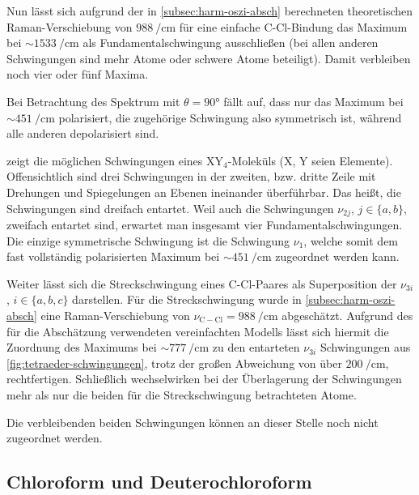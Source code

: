 \documentclass[../bericht.tex]{subfiles}
\begin{document}
        Nun lässt sich aufgrund der in \cref{subsec:harm-oszi-absch} berechneten theoretischen Raman-Verschiebung von $\SI{988}{\per\centi\meter}$ für eine einfache C-Cl-Bindung das Maximum bei $\sim \SI{1533}{\per\centi\meter}$ als Fundamentalschwingung ausschließen (bei allen anderen Schwingungen sind mehr Atome oder schwere Atome beteiligt). Damit verbleiben noch vier oder fünf Maxima.

        Bei Betrachtung des Spektrum mit $\theta=\ang{90}$ fällt auf, dass nur das Maximum bei $\sim\SI{451}{\per\centi\meter}$ polarisiert, die zugehörige Schwingung also symmetrisch ist, während alle anderen depolarisiert sind.

         zeigt die möglichen Schwingungen eines $\mathrm{XY_4}$-Moleküls (X, Y seien Elemente). Offensichtlich sind drei Schwingungen in der zweiten, bzw. dritte Zeile mit Drehungen und Spiegelungen an Ebenen ineinander überführbar. Das heißt, die Schwingungen sind dreifach entartet. Weil auch die Schwingungen $\nu_{2j}$, $j\in\{a,b\}$, zweifach entartet sind, erwartet man insgesamt vier Fundamentalschwingungen. Die einzige symmetrische Schwingung ist die Schwingung $\nu_1$, welche somit dem fast vollständig polarisierten Maximum bei $\sim\SI{451}{\per\centi\meter}$ zugeordnet werden kann.
        \medskip

        Weiter lässt sich die Streckschwingung eines C-Cl-Paares als Superposition der $\nu_{3i}$, $i\in\{ a,b,c\}$ darstellen. Für die Streckschwingung wurde in \cref{subsec:harm-oszi-absch} eine Raman-Verschiebung von $\nu_\mathrm{C-Cl}=\SI{988}{\per\centi\meter}$ abgeschätzt. Aufgrund des für die Abschätzung verwendeten vereinfachten Modells lässt sich hiermit die Zuordnung des Maximums bei $\sim \SI{777}{\per\centi\meter}$ zu den entarteten $\nu_{3i}$ Schwingungen aus \cref{fig:tetraeder-schwingungen}, trotz der großen Abweichung von über $\SI{200}{\per\centi\meter}$, rechtfertigen. Schließlich wechselwirken bei der Überlagerung der Schwingungen mehr als nur die beiden für die Streckschwingung betrachteten Atome.
        \medskip

        Die verbleibenden beiden Schwingungen können an dieser Stelle noch nicht zugeordnet werden.


      \subsection{Chloroform und Deuterochloroform}
      \label{subsec:chloro-deutero}
\end{document}
